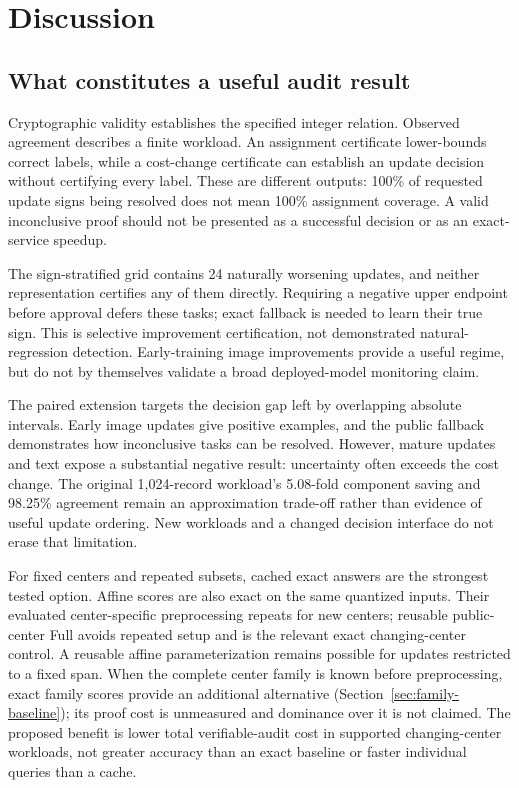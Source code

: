 \section{Discussion}\label{sec:discussion}
\subsection{What constitutes a useful audit result}
Cryptographic validity establishes the specified integer relation. Observed
agreement describes a finite workload. An assignment certificate lower-bounds
correct labels, while a cost-change certificate can establish an update
decision without certifying every label. These are different outputs: 100\%
of requested update signs being resolved does not mean 100\% assignment
coverage. A valid inconclusive proof should not be presented as a successful
decision or as an exact-service speedup.

The sign-stratified grid contains 24 naturally worsening updates, and neither
representation certifies any of them directly. Requiring a negative upper
endpoint before approval defers these tasks; exact fallback is needed to learn
their true sign. This is selective improvement certification, not demonstrated
natural-regression detection. Early-training image improvements provide a
useful regime, but do not by themselves validate a broad deployed-model
monitoring claim.

The paired extension targets the decision gap left by overlapping absolute
intervals. Early image updates give positive examples, and the public fallback
demonstrates how inconclusive tasks can be resolved. However, mature updates
and text expose a substantial negative result: uncertainty often exceeds the
cost change. The original 1,024-record workload's 5.08-fold component saving
and 98.25\% agreement remain an approximation trade-off rather than evidence
of useful update ordering. New workloads and a changed decision interface do
not erase that limitation.

For fixed centers and repeated subsets, cached exact answers are the strongest
tested option. Affine scores are also exact on the same quantized inputs.
Their evaluated center-specific preprocessing repeats for new centers;
reusable public-center Full avoids repeated setup and is the relevant exact
changing-center control. A reusable affine parameterization remains possible
for updates restricted to a fixed span. When the complete center family is
known before preprocessing, exact family scores provide an additional
alternative (Section~\ref{sec:family-baseline}); its proof cost is unmeasured
and dominance over it is not claimed. The proposed benefit is lower total
verifiable-audit cost in supported changing-center workloads, not greater
accuracy than an exact baseline or faster individual queries than a cache.

